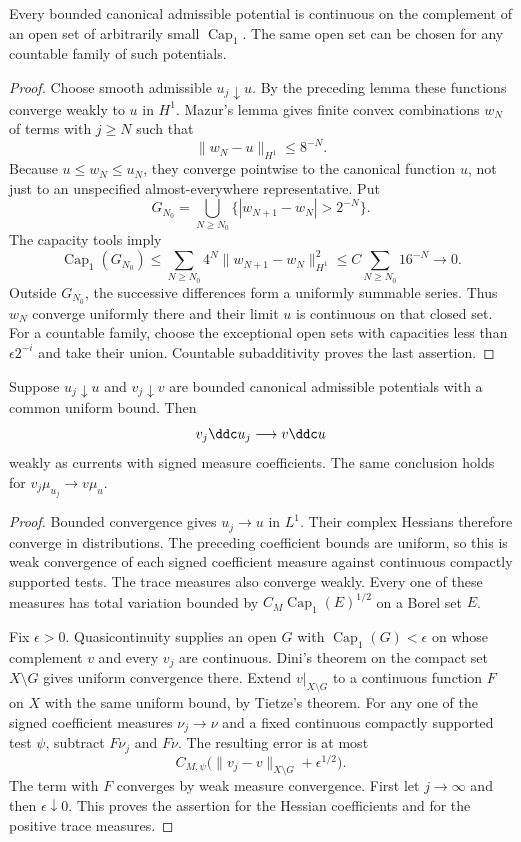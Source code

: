 \begin{lemma}\label{hessian:bounded-sobolev-quasicontinuity}
Every bounded canonical admissible potential is continuous on the
complement of an open set of arbitrarily small $\operatorname{Cap}_1$.
The same open set can be chosen for any countable family of such
potentials.
\end{lemma}
\begin{proof}
Choose smooth admissible $u_j\downarrow u$. By the preceding lemma
these functions converge weakly to $u$ in $H^1$. Mazur's lemma gives
finite convex combinations $w_N$ of terms with $j\geq N$ such that
\[
 \|w_N-u\|_{H^1}\leq8^{-N}.
\]
Because $u\leq w_N\leq u_N$, they converge pointwise to the canonical
function $u$, not just to an unspecified almost-everywhere representative.
Put
\[
 G_{N_0}=\bigcup_{N\geq N_0}
                  \{|w_{N+1}-w_N|>2^{-N}\}.
\]
The capacity tools imply
\[
 \operatorname{Cap}_1(G_{N_0})
 \leq\sum_{N\geq N_0}4^N\|w_{N+1}-w_N\|_{H^1}^2
 \leq C\sum_{N\geq N_0}16^{-N}\longrightarrow0.
\]
Outside $G_{N_0}$, the successive differences form a uniformly summable
series. Thus $w_N$ converge uniformly there and their limit $u$ is
continuous on that closed set. For a countable family, choose the
exceptional open sets with capacities less than $\epsilon2^{-i}$ and
take their union. Countable subadditivity proves the last assertion.
\end{proof}

\begin{proposition}\label{hessian:bounded-linear-weighted-convergence}
Suppose $u_j\downarrow u$ and $v_j\downarrow v$ are bounded canonical
admissible potentials with a common uniform bound. Then
\[
 v_j\ddc u_j\longrightarrow v\ddc u
\]
weakly as currents with signed measure coefficients. The same conclusion
holds for $v_j\mu_{u_j}\to v\mu_u$.
\end{proposition}
\begin{proof}
Bounded convergence gives $u_j\to u$ in $L^1$. Their complex Hessians
therefore converge in distributions. The preceding coefficient bounds
are uniform, so this is weak convergence of each signed coefficient
measure against continuous compactly supported tests. The trace measures
also converge weakly. Every one of these measures has total variation
bounded by $C_M\operatorname{Cap}_1(E)^{1/2}$ on a Borel set $E$.

Fix $\epsilon>0$. Quasicontinuity supplies an open $G$ with
$\operatorname{Cap}_1(G)<\epsilon$ on whose complement $v$ and every
$v_j$ are continuous. Dini's theorem on the compact set $X\setminus G$
gives uniform convergence there. Extend $v|_{X\setminus G}$ to a
continuous function $F$ on $X$ with the same uniform bound, by Tietze's
theorem. For any one of the signed coefficient measures $\nu_j\to\nu$
and a fixed continuous compactly supported test $\psi$, subtract
$F\nu_j$ and $F\nu$. The resulting error is at most
\[
 C_{M,\psi}\bigl(\|v_j-v\|_{X\setminus G}
                                      +\epsilon^{1/2}\bigr).
\]
The term with $F$ converges by weak measure convergence. First let
$j\to\infty$ and then $\epsilon\downarrow0$. This proves the assertion
for the Hessian coefficients and for the positive trace measures.
\end{proof}

